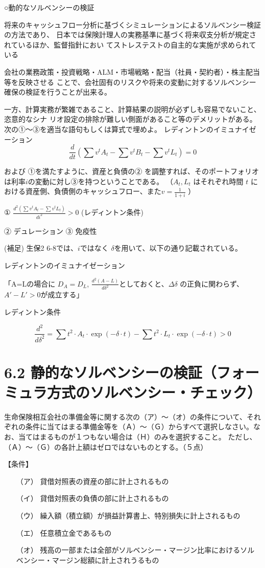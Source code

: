 \documentclass[report,gutter=10mm,fore-edge=10mm,uplatex,dvipdfmx]{jlreq}
\begin{document}
○動的なソルベンシーの検証

 将来のキャッシュフロー分析に基づくシミュレーションによるソルベンシー検証の方法であり、
日本では保険計理人の実務基準に基づく将来収支分析が規定されているほか、監督指針におい
てストレステストの自主的な実施が求められている

 会社の業務政策・投資戦略・ALM・市場戦略・配当（社員・契約者）・株主配当等を反映させる
ことで、会社固有のリスクや将来の変動に対するソルベンシー確保の検証を行うことが出来る。

 一方、計算実務が繁雑であること、計算結果の説明が必ずしも容易でないこと、恣意的なシナ
リオ設定の排除が難しい側面があること等のデメリットがある。
次の①～③を適当な語句もしくは算式で埋めよ。
レディントンのイミュナイゼーション
$$
\frac{d}{dt}(\sum v^tA_t-\sum v^tB_t-\sum v^tL_t)=0
$$

および
①を満たすように、資産と負債の②
を調整すれば、そのポートフォリオは利率$i$の変動に対し③を持つということである。
（$A_t, L_t$ はそれぞれ時間 $t$ における資産側、負債側のキャッシュフロー、また$v=\frac{1}{1+i}$ ）

\answer{}
① $\frac{d^2(\sum v^tA_t - \sum v^tL_t )}{di^2}>0$
(レディントン条件)

② デュレーション
③ 免疫性


(補足) 生保2 6-8では、$i$ではなく $\delta$を用いて、以下の通り記載されている。

レディントンのイミュナイゼーション

「A=Lの場合に $D_A=D_L$, $\frac{d^2(A-L)}{d\delta^2}$としておくと、$\Delta\delta$ の正負に関わらず、$A'-L'>0$が成立する」

レディントン条件

$$
\frac{d^2}{d\delta^2}=\sum t^2\cdot A_t \cdot \exp(-\delta\cdot t)-\sum t^2\cdot L_t \cdot\exp(-\delta\cdot t)>0
$$

\section{6.2 静的なソルベンシーの検証（フォーミュラ方式のソルベンシー・チェック）}

生命保険相互会社の準備金等に関する次の（ア）～（オ）の条件について、それぞれの条件に当てはまる準備金等を（Ａ）～（Ｇ）からすべて選択しなさい。なお、当てはまるものが１つもない場合は（Ｈ）のみを選択すること。
ただし、（Ａ）～（Ｇ）の各計上額はゼロではないものとする。（５点）

【条件】

\begin{itemize}
 \item [（ア）] 貸借対照表の資産の部に計上されるもの
 \item [（イ）] 貸借対照表の負債の部に計上されるもの
 \item [（ウ）] 繰入額（積立額）が損益計算書上、特別損失に計上されるもの
 \item [（エ）] 任意積立金であるもの
 \item [（オ）] 残高の一部または全部がソルベンシー・マージン比率におけるソルベンシー・マージン総額に計上されうるもの
\end{itemize}
\end{document}
